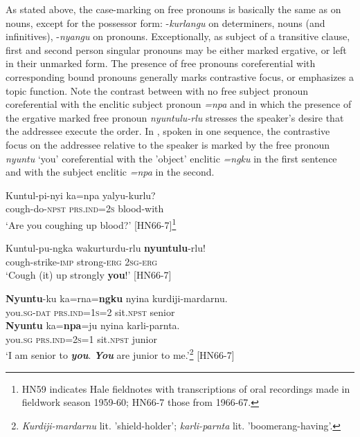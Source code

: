 \documentclass[output=paper]{../langscibook}
\begin{document}
As stated above, the case-marking on free pronouns is basically the same as on nouns, except for the possessor form: -\textit{kurlangu} on determiners, nouns (and infinitives), -\textit{nyangu} on pronouns. Exceptionally, as subject of a transitive clause, first and second person singular pronouns may be either marked ergative, or left in their unmarked form. The presence of free pronouns coreferential with corresponding bound pronouns generally marks contrastive focus, or emphasizes a topic function. Note the contrast between  with no free subject pronoun coreferential with the enclitic subject pronoun \textit{=npa} and  in which the presence of the ergative marked free pronoun \textit{nyuntulu-rlu} stresses the speaker's desire that the addressee execute the order. In , spoken in one sequence, the contrastive focus on the addressee relative to the speaker is marked by the free pronoun \textit{nyuntu} `you' coreferential with the 'object' enclitic \textit{=ngku} in the first sentence and with the subject enclitic \textit{=npa} in the second.

\ea%
    \label{ex:laughren:7}
\ea
\label{ex:laughren:7a}
\gll  Kuntul-pi-nyi   ka=npa   yalyu-kurlu? \\
    cough-do-\textsc{npst}  \textsc{prs.ind=2s}  blood-with\\
\glt `Are you coughing up blood?' [HN66-7]\footnote{HN59 indicates Hale fieldnotes with transcriptions of oral recordings made in fieldwork season 1959-60; HN66-7 those from 1966-67.}

\ex
\label{ex:laughren:7b}
\gll Kuntul-pu-ngka   wakurturdu-rlu \textbf{{nyuntulu}}{{}-rlu!}\\
    cough-strike-\textsc{imp}  strong-\textsc{erg}  2\textsc{sg-erg}\\
\glt `Cough (it) up strongly \textbf{{you}}!' [HN66-7]

\ex
\label{ex:laughren:7c}
\gll \textbf{Nyuntu}{}-ku   ka=rna=\textbf{ngku} nyina  kurdiji-mardarnu.\\
you.\textsc{sg-dat}  \textsc{prs.ind=1s=2}  sit.\textsc{npst}  senior\\
\gll \textbf{Nyuntu} {ka=}\textbf{{npa}}=ju   nyina karli-parnta.\\
    you.\textsc{sg}  \textsc{prs.ind=2s=1} sit.\textsc{npst}  junior\\
\glt `I am senior to \textbf{\textit{you}}. \textbf{\textit{You}} are junior to me.'\footnote{\textit{Kurdiji-mardarnu} lit. 'shield-holder'; \textit{karli-parnta} lit. 'boomerang-having'.} [HN66-7]
\z
\z
\end{document}

